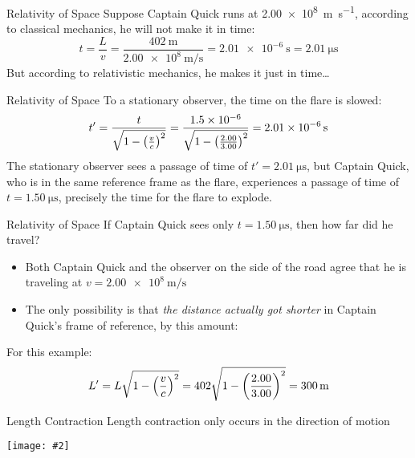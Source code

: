 \documentclass[12pt,compress,aspectratio=169]{beamer}
\newcommand{\pic}[2]{\texttt{[image: \#2]}}
\newcommand{\bigsqrt}{\ensuremath\sqrt{1-\left(\frac{v}{c}\right)^2}}
\newcommand{\eq}[2]{\vspace{#1}{\Large\begin{displaymath}#2\end{displaymath}}}
\begin{document}
\begin{frame}{Relativity of Space}
  Suppose Captain Quick runs at \SI{2.00e8}{\metre\per\second}, according to
  classical mechanics, he will not make it in time:
  \begin{displaymath}
    t= \frac{L}{v}=\frac{\SI{402}{\metre}}{\SI{2.00e8}{\metre\per\second}}
    =\SI{2.01e-6}{\second}=\SI{2.01}{\micro\second}
  \end{displaymath}
  But according to relativistic mechanics, he makes it just in time\ldots
\end{frame}


\begin{frame}{Relativity of Space}
  To a stationary observer, the time on the flare is slowed:
  \begin{displaymath}
    t'
    = \frac{t}{\bigsqrt}
    = \frac{\num{1.5e-6}}{\sqrt{1-\left(\frac{2.00}{3.00}\right)^2}}
    = \SI{2.01e-6}{\second}
  \end{displaymath}
  The stationary observer sees a passage of time of
  $t'=\SI{2.01}{\micro\second}$, but Captain Quick, who is in the same
  reference frame as the flare, experiences a passage of time of
  $t=\SI{1.50}{\micro\second}$, precisely the time for the flare to explode.
\end{frame}


\begin{frame}{Relativity of Space}
  If Captain Quick sees only $t=\SI{1.50}{\micro\second}$, then how far did he
  travel?
  \begin{itemize}
  \item Both Captain Quick and the observer on the side of the road agree that
    he is traveling at $v=\SI{2.00e8}{\metre\per\second}$
  \item The only possibility is that \emph{the distance actually got shorter}
    in Captain Quick's frame of reference, by this amount:
    
    \eq{-.2in}{
      \boxed{L'=L\bigsqrt}
    }
  \end{itemize}
  For this example:
  \begin{displaymath}
    L'=L\bigsqrt=402\sqrt{1-\left(\frac{2.00}{3.00}\right)^2}=\SI{300}{\metre}
  \end{displaymath}
\end{frame}


\begin{frame}{Length Contraction}
  Length contraction only occurs in the direction of motion
  \begin{center}
    \pic{.8}{graphics/baseball-contraction.jpg}
    \end{center}
\end{frame}
\end{document}

